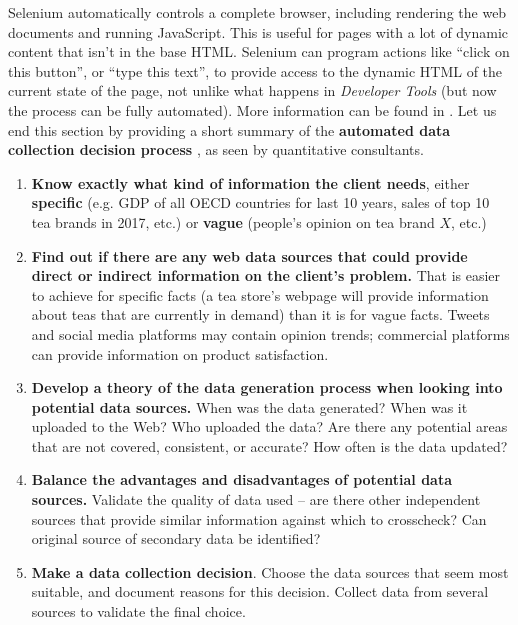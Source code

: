 \noindent Selenium automatically controls a complete browser, including rendering the web documents and running JavaScript. This is useful for pages with a lot of dynamic content that isn't in the base HTML. Selenium can program actions like ``click on this button'', or ``type this text'', to provide access to the dynamic HTML of the current state of the page, not unlike what happens in  \textit{Developer Tools} (but now the process can be fully automated). More information can be found in \cite{DC_S,DC_S2}.
\newl 
Let us end this section by providing a short summary of the \textbf{automated data collection decision process} \cite{DC_MRMN,DC_M}, as seen by  quantitative consultants. 
\begin{enumerate}
    \item \textbf{Know exactly what kind of information the client needs}, either \textbf{specific} (e.g. GDP of all OECD countries for last 10 years, sales of top 10 tea brands in 2017, etc.) or \textbf{vague} (people's opinion on tea brand $X$, etc.)
\item \textbf{Find out if there are any web data sources that could provide direct or indirect information on the client's problem.} That is easier to achieve for specific facts (a tea store's webpage will provide information about teas that are currently in demand) than it is for vague facts. Tweets and social media platforms may contain opinion trends; commercial platforms can provide information on product satisfaction.
\item \textbf{Develop a theory of the data generation process when looking into potential data sources.} When was the data generated? When was it uploaded to the Web? Who uploaded the data? Are there any potential areas that are not covered, consistent, or accurate? How often is the data updated?
\item \textbf{Balance the advantages and disadvantages of potential data sources.} Validate the quality of data used -- are there other independent sources that provide similar information against which to crosscheck? Can original source of secondary data be identified?
\item \textbf{Make a data collection decision}. Choose the data sources that seem most suitable, and document reasons for this decision. Collect data from several sources to validate the final choice. 
\end{enumerate}
